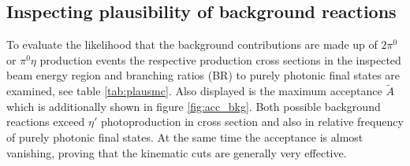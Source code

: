 \subsection{Inspecting plausibility of background reactions}
To evaluate the likelihood that the background contributions are made up of $2\pi^0$ or $\pi^0\eta$ production events the respective production cross sections in the inspected beam energy region and branching ratios (BR) to purely photonic final states are examined, see table \ref{tab:plausmc}. Also displayed is the maximum acceptance $\tilde{A}$ which is additionally shown in figure \ref{fig:acc_bkg}. Both possible background reactions exceed $\eta'$ photoproduction in cross section and also in relative frequency of purely photonic final states. At the same time the acceptance is almost vanishing, proving that the kinematic cuts are generally very effective. 

